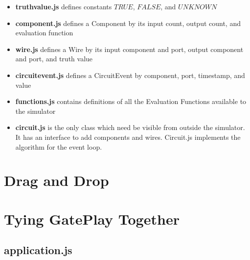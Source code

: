 \begin{itemize}
	\item \textbf{truthvalue.js} defines constants $TRUE$, $FALSE$, and $UNKNOWN$
	\item \textbf{component.js} defines a Component by its input count, output count, and evaluation function
	\item \textbf{wire.js} defines a Wire by its input component and port, output component and port, and truth value
	\item \textbf{circuitevent.js} defines a CircuitEvent by component, port, timestamp, and value
	\item \textbf{functions.js} contains definitions of all the Evaluation Functions available to the simulator 
	\item \textbf{circuit.js} is the only class which need be visible from outside the simulator. It has an interface to add components and wires. Circuit.js implements the algorithm for the event loop. 
\end{itemize}

\section{Drag and Drop}

\section{Tying GatePlay Together}

\subsection{application.js}
